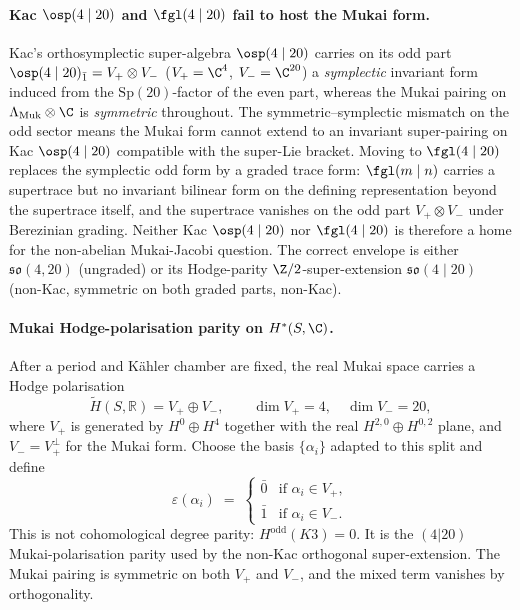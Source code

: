 \paragraph{Kac \texorpdfstring{$\osp(4 \mid 20)$}{osp(4 mid 20)} and \texorpdfstring{$\fgl(4 \mid 20)$}{gl(4 mid 20)} fail to host the Mukai form.}
Kac's orthosymplectic super-algebra $\osp(4 \mid 20)$ carries on
its odd part $\osp(4 \mid 20)_{\bar 1} = V_+ \otimes V_-$
($V_+ = \C^4$, $V_- = \C^{20}$) a \emph{symplectic} invariant form
induced from the $\mathrm{Sp}(20)$-factor of the even part, whereas
the Mukai pairing on $\Lambda_{\mathrm{Muk}} \otimes \C$ is
\emph{symmetric} throughout. The symmetric--symplectic mismatch on
the odd sector means the Mukai form cannot extend to an invariant
super-pairing on Kac $\osp(4 \mid 20)$ compatible with the super-Lie
bracket. Moving to $\fgl(4 \mid 20)$ replaces the symplectic odd
form by a graded trace form: $\fgl(m \mid n)$ carries a supertrace
but no invariant bilinear form on the defining representation
beyond the supertrace itself, and the supertrace vanishes on the
odd part $V_+ \otimes V_-$ under Berezinian grading. Neither
Kac $\osp(4 \mid 20)$ nor $\fgl(4 \mid 20)$ is therefore a home
for the non-abelian Mukai-Jacobi question. The correct envelope is
either $\mathfrak{so}(4, 20)$ (ungraded) or its Hodge-parity
$\Z/2$-super-extension $\mathfrak{so}(4 \mid 20)$
(non-Kac, symmetric on both graded parts, non-Kac).

\paragraph{Mukai Hodge-polarisation parity on \texorpdfstring{$H^*(S, \C)$}{H-*(S, C)}.}
After a period and Kähler chamber are fixed, the real Mukai space carries
a Hodge polarisation
\[
 \widetilde H(S,\mathbb R)=V_+\oplus V_-,
 \qquad
 \dim V_+=4,\quad \dim V_-=20,
\]
where $V_+$ is generated by $H^0\oplus H^4$ together with the real
$H^{2,0}\oplus H^{0,2}$ plane, and $V_-=V_+^\perp$ for the Mukai form.
Choose the basis $\{\alpha_i\}$ adapted to this split and define
\begin{equation}\label{eq:k3yang-hodge-parity-grading}
 \varepsilon(\alpha_i) \;=\;
 \begin{cases}
 \bar 0 & \text{if } \alpha_i \in V_+,\\[2pt]
 \bar 1 & \text{if } \alpha_i \in V_-.
 \end{cases}
\end{equation}
This is not cohomological degree parity: $H^{\mathrm{odd}}(K3)=0$.
It is the $(4|20)$ Mukai-polarisation parity used by the non-Kac
orthogonal super-extension. The Mukai pairing is symmetric on both
$V_+$ and $V_-$, and the mixed term vanishes by orthogonality.

